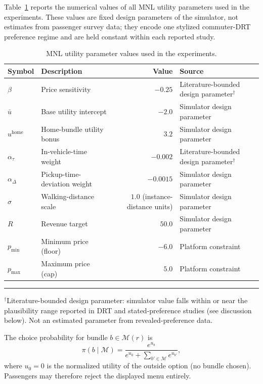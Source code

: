 Table~\ref{tab:mnl_params} reports the numerical values of all MNL utility parameters used in the experiments. These values are fixed design parameters of the simulator, not estimates from passenger survey data; they encode one stylized commuter-DRT preference regime and are held constant within each reported study.

\begin{table}[t]
\centering
\caption{MNL utility parameter values used in the experiments.}
\label{tab:mnl_params}
\begin{tabular}{llrl}
\hline
Symbol & Description & Value & Source \\
\hline
$\beta$ & Price sensitivity & $-0.25$ & Literature-bounded design parameter$^{\dagger}$ \\
$\bar{u}$ & Base utility intercept & $-2.0$ & Simulator design parameter \\
$u^{\text{home}}$ & Home-bundle utility bonus & $3.2$ & Simulator design parameter \\
$\alpha_{\tau}$ & In-vehicle-time weight & $-0.002$ & Literature-bounded design parameter$^{\dagger}$ \\
$\alpha_{\Delta}$ & Pickup-time-deviation weight & $-0.0015$ & Simulator design parameter \\
$\sigma$ & Walking-distance scale & $1.0$ (instance-distance units) & Simulator design parameter \\
$R$ & Revenue target & $50.0$ & Simulator design parameter \\
$p_{\min}$ & Minimum price (floor) & $-6.0$ & Platform constraint \\
$p_{\max}$ & Maximum price (cap) & $5.0$ & Platform constraint \\
\hline
\end{tabular}
\noindent\rule{\linewidth}{0.4pt}
\small $^{\dagger}$Literature-bounded design parameter: simulator value falls within or near the plausibility range reported in DRT and stated-preference studies (see discussion below). Not an estimated parameter from revealed-preference data.
\end{table}

The choice probability for bundle $b \in \mathcal{M}(r)$ is
\begin{equation}
  \pi(b \mid \mathcal{M}) = \frac{e^{u_b}}{e^{u_0} + \sum_{b' \in \mathcal{M}} e^{u_{b'}}},
  \label{eq:mnl_prob}
\end{equation}
where $u_0 = 0$ is the normalized utility of the outside option (no bundle chosen). Passengers may therefore reject the displayed menu entirely.

